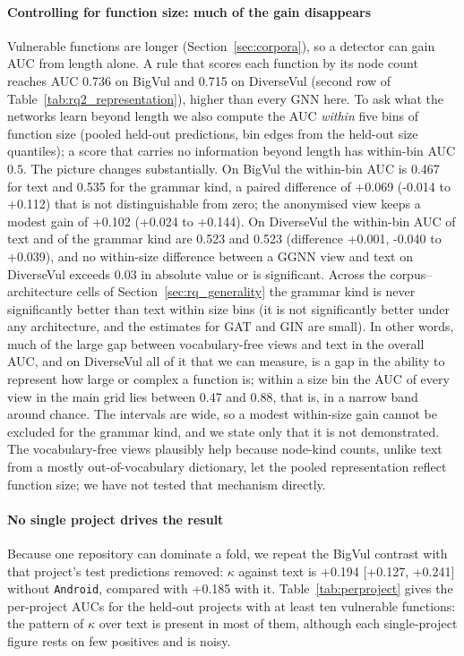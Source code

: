 \documentclass[pdflatex,sn-basic]{sn-jnl}
\theoremstyle{thmstyleone}%
\newcommand{\cBvGgnnAnonVLexSsD}{+0.102}
\newcommand{\cBvGgnnAnonVLexSsHi}{+0.144}
\newcommand{\cBvGgnnAnonVLexSsLo}{+0.024}
\newcommand{\cBvGgnnKindVLexD}{+0.185}
\newcommand{\cBvGgnnKindVLexNoAnd}{+0.194 [+0.127, +0.241]}
\newcommand{\cBvGgnnKindVLexSsD}{+0.069}
\newcommand{\cBvGgnnKindVLexSsHi}{+0.112}
\newcommand{\cBvGgnnKindVLexSsLo}{-0.014}
\newcommand{\cDvGgnnKindVLexSsD}{+0.001}
\newcommand{\cDvGgnnKindVLexSsHi}{+0.039}
\newcommand{\cDvGgnnKindVLexSsLo}{-0.040}
\newcommand{\mBvGgnnKindSs}{0.535}
\newcommand{\mBvGgnnLexSs}{0.467}
\newcommand{\mDvGgnnKindSs}{0.523}
\newcommand{\mDvGgnnLexSs}{0.523}
\newcommand{\numbigvulTopTestProject}{Android}
\newcommand{\numbvSizeAuc}{0.736}
\newcommand{\numdvSizeAuc}{0.715}
\newcommand{\numssMax}{0.88}
\newcommand{\numssMin}{0.47}
\begin{document}
\paragraph{Controlling for function size: much of the gain disappears}
Vulnerable functions are longer (Section~\ref{sec:corpora}), so a detector can
gain AUC from length alone. A rule that scores each function by its node count
reaches AUC \numbvSizeAuc{} on BigVul and \numdvSizeAuc{} on DiverseVul (second
row of Table~\ref{tab:rq2_representation}), higher than every GNN here. To ask
what the networks learn beyond length we also compute the AUC \emph{within} five
bins of function size (pooled held-out predictions, bin edges from the
held-out size quantiles); a score that carries no information beyond length has
within-bin AUC $0.5$. The picture changes substantially. On BigVul the
within-bin AUC is \mBvGgnnLexSs{} for text and \mBvGgnnKindSs{} for the grammar
kind, a paired difference of \cBvGgnnKindVLexSsD{}
(\cBvGgnnKindVLexSsLo{} to \cBvGgnnKindVLexSsHi{}) that is not distinguishable
from zero; the anonymised view keeps a modest gain of \cBvGgnnAnonVLexSsD{}
(\cBvGgnnAnonVLexSsLo{} to \cBvGgnnAnonVLexSsHi{}). On DiverseVul the within-bin
AUC of text and of the grammar kind are \mDvGgnnLexSs{} and \mDvGgnnKindSs{}
(difference \cDvGgnnKindVLexSsD{}, \cDvGgnnKindVLexSsLo{} to
\cDvGgnnKindVLexSsHi{}), and no within-size difference between a GGNN view and text on DiverseVul
exceeds 0.03 in absolute value or is significant. Across the
corpus--architecture cells of Section~\ref{sec:rq_generality} the grammar kind is
never significantly better than text within size bins (it is not significantly better
under any architecture, and the estimates for GAT and GIN are small). In other words, much of the large gap between
vocabulary-free views and text in the overall AUC, and on DiverseVul all of it
that we can measure, is a gap in the ability to represent how large or complex a
function is;
within a size bin the AUC of every view in the main grid lies between
\numssMin{} and \numssMax{}, that is, in a narrow band around chance. The
intervals are wide, so a modest within-size gain cannot be excluded for the
grammar kind, and we state only that it is not demonstrated.
The vocabulary-free views plausibly help because node-kind counts, unlike text
from a mostly out-of-vocabulary dictionary, let the pooled representation
reflect function size; we have not tested that mechanism directly.

\paragraph{No single project drives the result}
Because one repository can dominate a fold, we repeat the BigVul contrast with
that project's test predictions removed: $\kappa$ against text is
\cBvGgnnKindVLexNoAnd{} without \texttt{\numbigvulTopTestProject}, compared with
\cBvGgnnKindVLexD{} with it. Table~\ref{tab:perproject} gives the per-project
AUCs for the held-out projects with at least ten vulnerable functions:
the pattern of $\kappa$ over text is present in most of them, although each
single-project figure rests on few positives and is noisy.
\end{document}

